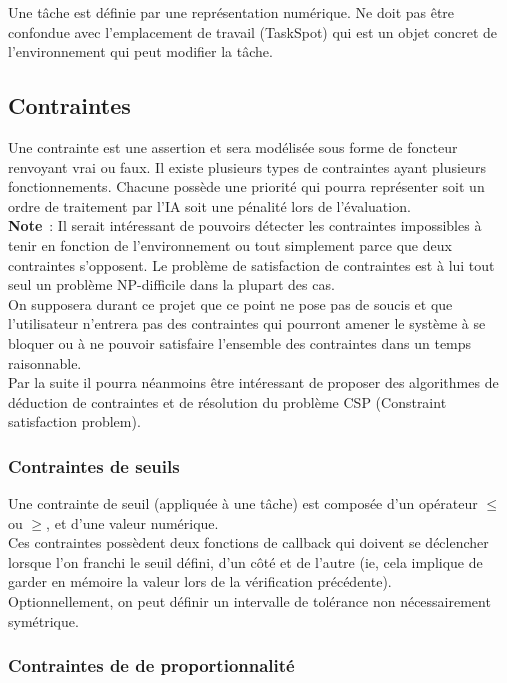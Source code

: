 Une tâche est définie par une représentation numérique. Ne doit pas être confondue avec l'emplacement de travail (TaskSpot) qui est un objet concret de l'environnement qui peut modifier la  tâche.

\subsection{Contraintes}

Une contrainte est une assertion et sera modélisée sous forme de foncteur renvoyant vrai ou faux.
Il existe plusieurs types de contraintes ayant plusieurs fonctionnements. Chacune possède une priorité qui pourra représenter soit un ordre de traitement par l'IA soit une pénalité lors de l'évaluation. \\

\textbf{Note}~: Il serait intéressant de pouvoirs détecter les contraintes impossibles à tenir en fonction de l'environnement ou tout simplement parce que deux contraintes s'opposent. Le problème de satisfaction de contraintes est à lui tout seul un problème NP-difficile dans la plupart des cas.\\
\indent On supposera durant ce projet que ce point ne pose pas de soucis et que l'utilisateur n'entrera pas des contraintes qui pourront amener le système à se bloquer ou à ne pouvoir satisfaire l'ensemble des contraintes dans un temps raisonnable.\\
\indent Par la suite il pourra néanmoins être intéressant de proposer des algorithmes de déduction de contraintes et de résolution du problème CSP (Constraint satisfaction problem).

\subsubsection{Contraintes de seuils}

Une contrainte de seuil (appliquée à une tâche) est composée d'un opérateur $\leq$ ou $\geq$, et d'une valeur numérique.\\
\indent Ces contraintes possèdent deux fonctions de callback qui doivent se déclencher lorsque l'on franchi le seuil défini, d'un côté et de l'autre (ie, cela implique de garder en mémoire la valeur lors de la vérification précédente).\\
\indent Optionnellement, on peut définir un intervalle de tolérance non nécessairement symétrique.

\subsubsection{Contraintes de de proportionnalité}

